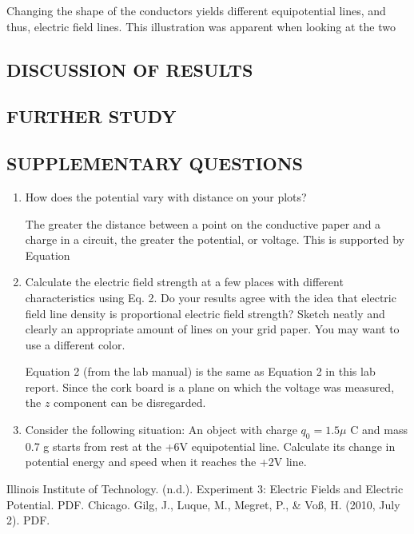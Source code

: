 \documentclass [12pt, letterpaper, twoside] {article}
\begin{document}
Changing the shape of the conductors yields different equipotential lines, and thus, electric field lines. This illustration was apparent when looking at the two 
\subsection* {DISCUSSION OF RESULTS}

\subsection* {FURTHER STUDY}

\subsection* {SUPPLEMENTARY QUESTIONS}
\begin{enumerate}
  \item How does the potential vary with distance on your plots?

The greater the distance between a point on the conductive paper and a charge in a circuit, the greater the potential, or voltage. This is supported by Equation 
  \item Calculate the electric field strength at a few places with different characteristics using Eq. 2. Do your results agree with the idea that electric field line density is proportional electric field strength? Sketch neatly and clearly an appropriate amount of lines on your grid paper. You may want to use a different color.

Equation 2 (from the lab manual) \cite{labManual} is the same as Equation 2 in this lab report. Since the cork board is a plane on which the voltage was measured, the \(z\) component can be disregarded.
  \item Consider the following situation: An object with charge \(q_{0} = 1.5\mu\) C and mass 0.7 g starts from rest at the +6V equipotential line. Calculate its change in potential energy and speed when it reaches the +2V line.
\end {enumerate}

  Illinois Institute of Technology. (n.d.). Experiment 3: Electric Fields and Electric Potential. PDF. Chicago.
  Gilg, J., Luque, M., Megret, P., \& Voß, H. (2010, July 2). PDF.
\end{document}
